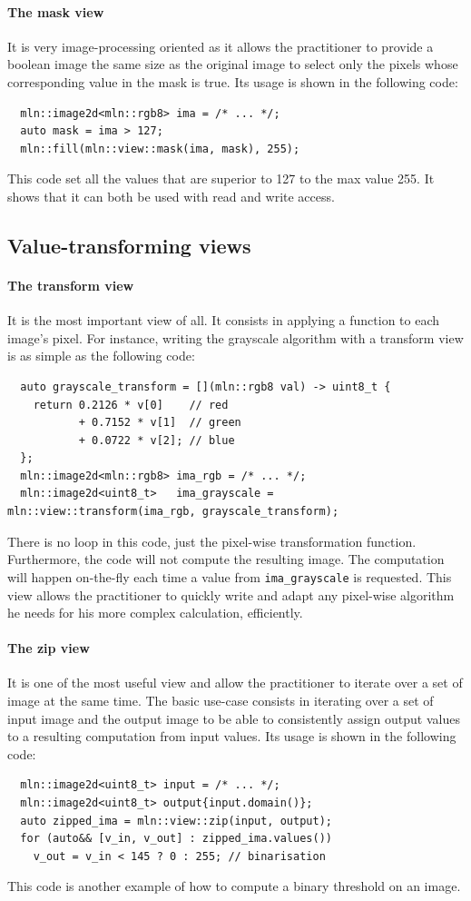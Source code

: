 \paragraph{The mask view} It is very image-processing oriented as it allows the practitioner to provide a boolean image
the same size as the original image to select only the pixels whose corresponding value in the mask is true. Its usage
is shown in the following code:
\begin{verbatim}
  mln::image2d<mln::rgb8> ima = /* ... */;
  auto mask = ima > 127;
  mln::fill(mln::view::mask(ima, mask), 255);
\end{verbatim}
This code set all the values that are superior to 127 to the max value 255. It shows that it can both be used with read
and write access.


\subsection{Value-transforming views}

\paragraph{The transform view} It is the most important view of all. It consists in applying a function to each image's
pixel. For instance, writing the grayscale algorithm with a transform view is as simple as the following code:
\begin{verbatim}
  auto grayscale_transform = [](mln::rgb8 val) -> uint8_t {
    return 0.2126 * v[0]    // red
           + 0.7152 * v[1]  // green
           + 0.0722 * v[2]; // blue
  };
  mln::image2d<mln::rgb8> ima_rgb = /* ... */;
  mln::image2d<uint8_t>   ima_grayscale = mln::view::transform(ima_rgb, grayscale_transform);
\end{verbatim}
There is no loop in this code, just the pixel-wise transformation function. Furthermore, the code will not compute the
resulting image. The computation will happen on-the-fly each time a value from \texttt{ima\_grayscale} is requested.
This view allows the practitioner to quickly write and adapt any pixel-wise algorithm he needs for his more complex
calculation, efficiently.

\paragraph{The zip view} It is one of the most useful view and allow the practitioner to iterate over a set of image at
the same time. The basic use-case consists in iterating over a set of input image and the output image to be able to
consistently assign output values to a resulting computation from input values. Its usage is shown in the following
code:
\begin{verbatim}
  mln::image2d<uint8_t> input = /* ... */;
  mln::image2d<uint8_t> output{input.domain()};
  auto zipped_ima = mln::view::zip(input, output);
  for (auto&& [v_in, v_out] : zipped_ima.values())
    v_out = v_in < 145 ? 0 : 255; // binarisation
\end{verbatim}
This code is another example of how to compute a binary threshold on an image.

